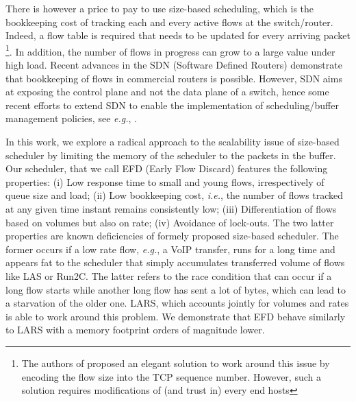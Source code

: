 \documentclass[preprint,12pt]{elsarticle}
\begin{document}
There is however a price to pay to use size-based scheduling, which is the bookkeeping cost of tracking each and every active flows at the switch/router. %
Indeed, a flow table is required that needs to be updated for every arriving packet \footnote{The authors of \cite{Avrachenkov04Run2c} proposed an elegant solution to work around this issue by encoding the flow size into the TCP sequence number. However, such a solution requires modifications of (and trust in) every end hosts}. %
In addition, the number of flows in progress can grow to a large value under high load. 
Recent advances in the SDN (Software Defined Routers) demonstrate that bookkeeping of flows in commercial routers is possible. However, SDN aims at exposing the control plane and not the data plane of a switch, hence some recent efforts to extend SDN to enable the implementation of scheduling/buffer management policies, see \textit{e.g.}, \cite{sivaraman2013no}.

In this work, we explore a radical approach to the scalability issue of size-based scheduler by limiting the memory of the scheduler to the packets in the buffer. Our scheduler, that we call  EFD (Early Flow Discard) features the following properties: (i) Low response time to small and young flows, irrespectively of queue size and load; (ii) Low bookkeeping cost, \textit{\textit{i.e.}}, the number of flows tracked at any given time instant remains consistently low; (iii) Differentiation of flows based on volumes but also on rate; (iv) Avoidance of lock-outs. The two latter properties are known deficiencies of formely proposed size-based scheduler. The former occurs if a low rate flow, \textit{e.g.}, a VoIP transfer, runs for a long time and appears fat to the scheduler that simply accumulates transferred volume of flows like LAS or Run2C. The latter refers to the race condition that can occur if a long flow starts while another long flow has sent a lot of bytes, which can lead to a starvation of the older one. LARS, which accounts jointly for volumes and rates is able to work around this problem. We demonstrate that EFD behave similarly to LARS with a memory footprint orders of magnitude lower.%
\end{document}
